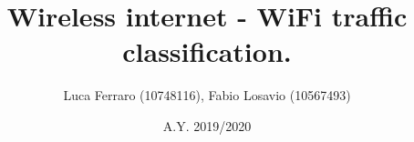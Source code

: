 \documentclass{article} %
\title{\textbf{\huge{Wireless internet - WiFi traffic classification.}}}
\author{Luca Ferraro (10748116), Fabio Losavio (10567493)}
\date{A.Y. 2019/2020}
\begin{document}

\begin{titlingpage}
    \maketitle
\end{titlingpage}

\newpage{}

\tableofcontents

\newpage{}
\end{document}
